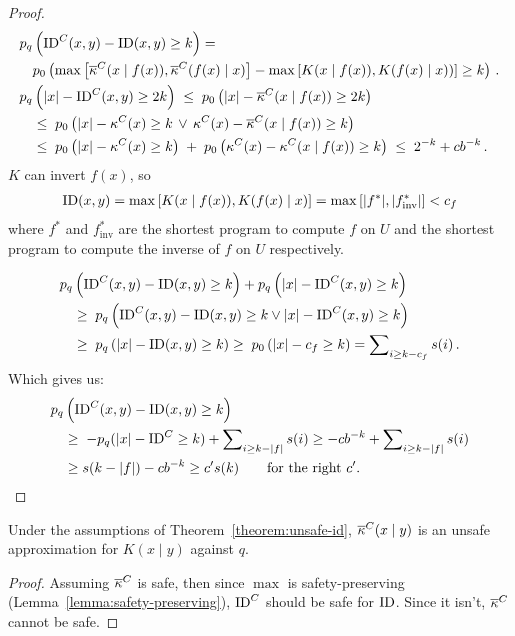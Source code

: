 \begin{proof}
\begin{align*} 
p_q&\left({\operatorname*{ID}}^C(x, y) - \operatorname*{ID}(x, y) \geq k \right) = \\
 &p_0\left(\max\left[{\overline{\kappa}}^C(x \mid f(x)), {\overline{\kappa}}^C(f(x)\mid x)\right] - \max\left[K(x\mid f(x)), K(f(x)\mid x))\right] \geq k\right) \,\text{.}\\
p_q&\left(|x| - {\operatorname*{ID}}^C(x, y) \geq 2k\right) \;\leq\; p_0\left(|x| - {\overline{\kappa}}^C(x \mid f(x)) \geq 2k\right)\\
&\leq \;p_0\left(|x| - \kappa^C(x) \geq k \,\lor\, \kappa^C(x) - {\overline{\kappa}}^C(x \mid f(x)) \geq k\right)\\
&\leq \;p_0\left(|x| - \kappa^C(x) \geq k \right) \;+\; p_0\left(\kappa^C(x) - \kappa^C(x \mid f(x)) \geq k\right) \;\leq\; 2^{-k} + cb^{-k} \,\text{.}
\end{align*}
$K$ can invert $f(x)$, so 
\begin{align*}
\operatorname*{ID}(x, y) = \max\left[K(x\mid f(x)), K(f(x)\mid x)\right] = \max\left[|f^*|, |f^*_{\text{inv}}|\right] < c_f\end
{align*}
where $f^*$ and $f^*_{\text{inv}}$ are the shortest program to compute $f$ on $U$ and the shortest program to compute the inverse of $f$ on $U$ respectively. 
 
\begin{align*}
p_q&\left({\operatorname*{ID}}^C(x,y) - \operatorname*{ID}(x,y) \geq k\right) + p_q\left(|x| - {\operatorname*{ID}}^C(x,y) \geq k\right)\\
&\geq\; p_q\left({\operatorname*{ID}}^C(x, y) - \operatorname*{ID}(x, y) \geq k \lor|x| - {\operatorname*{ID}}^C(x, y) \geq k\right)\\
&\geq\; p_q\left(|x| - \operatorname*{ID}(x, y) \geq k \right) \geq\; p_0\left(|x| - c_f \geq k\right) = \sum\nolimits_{i \geq k- c_f} s(i)\,\text{.}
\end{align*}
Which gives us:\belowdisplayskip=-12pt
\begin{align*}
p_q&\left({\operatorname*{ID}}^C(x,y) - \operatorname*{ID}(x,y) \geq k\right) \\
&\geq \; - p_q(|x| - {\operatorname*{ID}}^C \geq k) + \sum\nolimits_{i \geq k- |f|} s(i) \geq- cb^{-k} + \sum\nolimits_{i \geq k- |f|} s(i) \\
& \geq s(k-|f|) - cb^{-k} \geq c's(k) \quad\quad\text{for the right  $c'$.}
\end{align*}
\end{proof}

\begin{corollary}
Under the assumptions of Theorem~\ref{theorem:unsafe-id}, ${\overline{\kappa}}^C(x\mid y)$ is an unsafe approximation for $K(x\mid y)$ against $q$. 
\end{corollary}
\begin{proof}
Assuming ${\overline{\kappa}}^C$ is safe, then since $\max$ is safety-preserving (Lemma~\ref{lemma:safety-preserving}), $\operatorname*{ID}^C$ should be safe for $\operatorname*{ID}$. Since it isn't, ${\overline{\kappa}}^C$ cannot be safe.
\end{proof}

